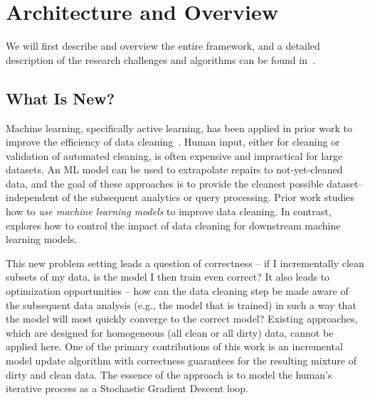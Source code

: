 \section{Architecture and Overview}\label{arch}
We will first describe \sys and overview the entire framework, and a detailed description of the research challenges and algorithms can be found in~\cite{activecleanarxiv}.

\subsection{What Is New?}
Machine learning, specifically active learning, has been applied in prior work to improve the efficiency of data cleaning~\cite{yakout2013don,DBLP:journals/pvldb/YakoutENOI11,gokhale2014corleone}.
Human input, either for cleaning or validation of automated cleaning, is often expensive and impractical for large datasets.
An ML model can be used to extrapolate repairs to not-yet-cleaned data, and the goal of these approaches is to provide the cleanest possible dataset--independent of the subsequent analytics or query processing.
Prior work studies how to \emph{use machine learning models} to improve data cleaning.
In contrast, \sys explores how to control the impact of data cleaning for downstream machine learning models.

This new problem setting leads a question of correctness -- if I incrementally clean subsets of my data, is the model I then train even correct?  
It also leads to optimization opportunities -- how can the data cleaning step be made aware of the subsequent data analysis (e.g., the model that is trained) 
in such a way that the model will most quickly converge to the correct model?
Existing approaches, which are designed for homogeneous (all clean or all dirty) data, cannot be applied here.
One of the primary contributions of this work is an incremental model update algorithm with correctness guarantees for the resulting mixture of dirty and clean data.
The essence of the approach is to model the human's iterative process as a Stochastic Gradient Descent loop.

